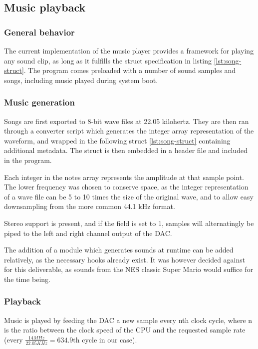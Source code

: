 \subsection{Music playback}

\subsubsection{General behavior}

The current implementation of the music player provides a framework for playing any sound clip, as long as it fulfills the struct specification in listing \ref{lst:song-struct}.
The program comes preloaded with a number of sound samples and songs, including music played during system boot.


\subsubsection{Music generation}

Songs are first exported to 8-bit wave files at 22.05 kilohertz.
They are then ran through a converter script which generates the integer array representation of the waveform, and wrapped in the following struct \ref{lst:song-struct} containing additional metadata.
The struct is then embedded in a header file and included in the program.



Each integer in the notes array represents the amplitude at that sample point.
The lower frequency was chosen to conserve space, as the integer representation of a wave file can be 5 to 10 times the size of the original wave, and to allow easy downsampling from the more common 44.1 kHz format.

Stereo support is present, and if the field is set to 1, samples will alternatingly be piped to the left and right channel output of the DAC.

The addition of a module which generates sounds at runtime can be added relatively, as the necessary hooks already exist. It was however decided against for this deliverable, as sounds from the NES classic Super Mario would suffice for the time being.

\subsubsection{Playback}

Music is played by feeding the DAC a new sample every nth clock cycle, where n is the ratio between the clock speed of the CPU and the requested sample rate (every $ \frac{14 MHz}{22.05 KHz} = 634.9 $th cycle in our case).

